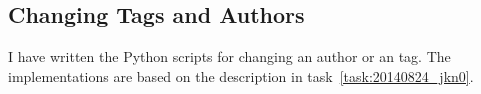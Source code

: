 \subsection{Changing Tags and Authors}
\label{task:20140826_jkn0}
I have written the Python scripts for changing an author or an tag. The implementations are based on the description in task~\ref{task:20140824_jkn0}.
